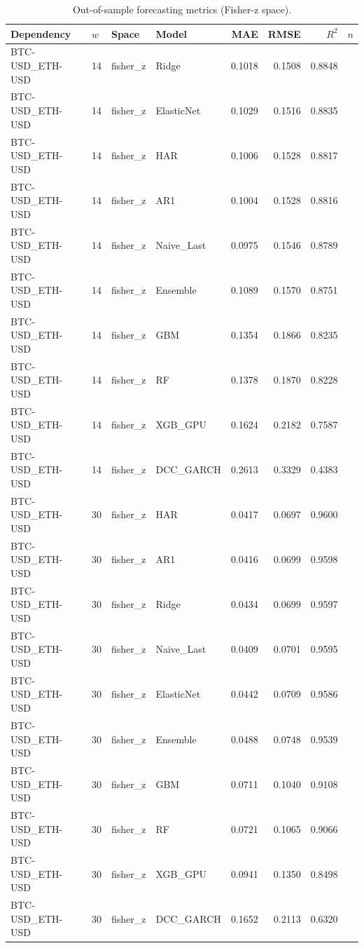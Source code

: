\begin{table}[H]
\centering
\small
\caption{Out-of-sample forecasting metrics (Fisher-z space).}
\label{tab:model_comparison}
\begin{tabular}{llllrrrr}
\toprule
Dependency & $w$ & Space & Model & MAE & RMSE & $R^2$ & $n$ \\
\midrule
BTC-USD_ETH-USD & 14 & fisher_z & Ridge & 0.1018 & 0.1508 & 0.8848 &  \\
BTC-USD_ETH-USD & 14 & fisher_z & ElasticNet & 0.1029 & 0.1516 & 0.8835 &  \\
BTC-USD_ETH-USD & 14 & fisher_z & HAR & 0.1006 & 0.1528 & 0.8817 &  \\
BTC-USD_ETH-USD & 14 & fisher_z & AR1 & 0.1004 & 0.1528 & 0.8816 &  \\
BTC-USD_ETH-USD & 14 & fisher_z & Naive_Last & 0.0975 & 0.1546 & 0.8789 &  \\
BTC-USD_ETH-USD & 14 & fisher_z & Ensemble & 0.1089 & 0.1570 & 0.8751 &  \\
BTC-USD_ETH-USD & 14 & fisher_z & GBM & 0.1354 & 0.1866 & 0.8235 &  \\
BTC-USD_ETH-USD & 14 & fisher_z & RF & 0.1378 & 0.1870 & 0.8228 &  \\
BTC-USD_ETH-USD & 14 & fisher_z & XGB_GPU & 0.1624 & 0.2182 & 0.7587 &  \\
BTC-USD_ETH-USD & 14 & fisher_z & DCC_GARCH & 0.2613 & 0.3329 & 0.4383 &  \\
BTC-USD_ETH-USD & 30 & fisher_z & HAR & 0.0417 & 0.0697 & 0.9600 &  \\
BTC-USD_ETH-USD & 30 & fisher_z & AR1 & 0.0416 & 0.0699 & 0.9598 &  \\
BTC-USD_ETH-USD & 30 & fisher_z & Ridge & 0.0434 & 0.0699 & 0.9597 &  \\
BTC-USD_ETH-USD & 30 & fisher_z & Naive_Last & 0.0409 & 0.0701 & 0.9595 &  \\
BTC-USD_ETH-USD & 30 & fisher_z & ElasticNet & 0.0442 & 0.0709 & 0.9586 &  \\
BTC-USD_ETH-USD & 30 & fisher_z & Ensemble & 0.0488 & 0.0748 & 0.9539 &  \\
BTC-USD_ETH-USD & 30 & fisher_z & GBM & 0.0711 & 0.1040 & 0.9108 &  \\
BTC-USD_ETH-USD & 30 & fisher_z & RF & 0.0721 & 0.1065 & 0.9066 &  \\
BTC-USD_ETH-USD & 30 & fisher_z & XGB_GPU & 0.0941 & 0.1350 & 0.8498 &  \\
BTC-USD_ETH-USD & 30 & fisher_z & DCC_GARCH & 0.1652 & 0.2113 & 0.6320 &  \\

\end{tabular}
\end{table}
